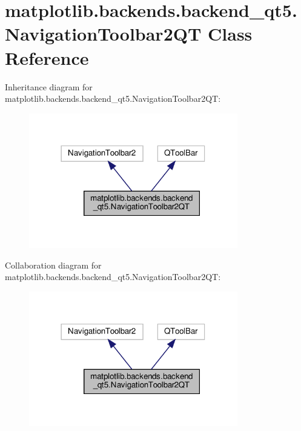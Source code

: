 \hypertarget{classmatplotlib_1_1backends_1_1backend__qt5_1_1NavigationToolbar2QT}{}\section{matplotlib.\+backends.\+backend\+\_\+qt5.\+Navigation\+Toolbar2\+QT Class Reference}
\label{classmatplotlib_1_1backends_1_1backend__qt5_1_1NavigationToolbar2QT}


Inheritance diagram for matplotlib.\+backends.\+backend\+\_\+qt5.\+Navigation\+Toolbar2\+QT\+:
\nopagebreak
\begin{figure}[H]
\begin{center}
\leavevmode
\includegraphics[width=258pt]{classmatplotlib_1_1backends_1_1backend__qt5_1_1NavigationToolbar2QT__inherit__graph}
\end{center}
\end{figure}


Collaboration diagram for matplotlib.\+backends.\+backend\+\_\+qt5.\+Navigation\+Toolbar2\+QT\+:
\nopagebreak
\begin{figure}[H]
\begin{center}
\leavevmode
\includegraphics[width=258pt]{classmatplotlib_1_1backends_1_1backend__qt5_1_1NavigationToolbar2QT__coll__graph}
\end{center}
\end{figure}
